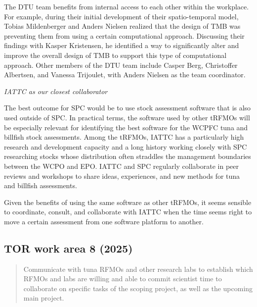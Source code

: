 \documentclass{SCreport}
\begin{document}
The DTU team benefits from internal access to each other within the workplace.
For example, during their initial development of their spatio-temporal model,
Tobias Mildenberger and Anders Nielsen realized that the design of TMB was
preventing them from using a certain computational approach. Discussing their
findings with Kasper Kristensen, he identified a way to significantly alter and
improve the overall design of TMB to support this type of computational
approach. Other members of the DTU team include Casper Berg, Christoffer
Albertsen, and Vanessa Trijoulet, with Anders Nielsen as the team coordinator.

\vspace{2ex}

\textit{IATTC as our closest collaborator}

The best outcome for SPC would be to use stock assessment software that is also
used outside of SPC. In practical terms, the software used by other tRFMOs will
be especially relevant for identifying the best software for the WCPFC tuna and
billfish stock assessments. Among the tRFMOs, IATTC has a particularly high
research and development capacity and a long history working closely with SPC
researching stocks whose distribution often straddles the management boundaries
between the WCPO and EPO. IATTC and SPC regularly collaborate in peer reviews
and workshops to share ideas, experiences, and new methods for tuna and billfish
assessments.

Given the benefits of using the same software as other tRFMOs, it seems sensible
to coordinate, consult, and collaborate with IATTC when the time seems right to
move a certain assessment from one software platform to another.

\vspace{2ex}

\hypertarget{link:tor-8}{}
\subsection{TOR work area 8 (2025)}
\label{sec:tor-8}

\begin{quote}\sf
  Communicate with tuna RFMOs and other research labs to establish which RFMOs
  and labs are willing and able to commit scientist time to collaborate on
  specific tasks of the scoping project, as well as the upcoming main project.
\end{quote}

\vspace{2ex}
\end{document}
